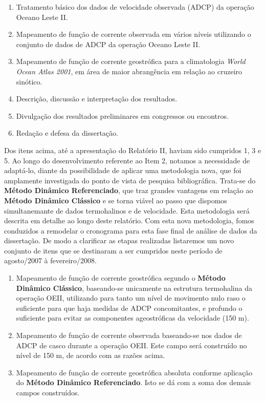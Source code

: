 \documentclass[12pt,portuguese,a4paper,pdftex]{article}
\begin{document}
\begin{enumerate}

\item Tratamento básico dos dados de velocidade observada (ADCP) da operação Oceano Leste II.

\item Mapeamento de função de corrente observada em vários níveis utilizando o conjunto 
de dados de ADCP da operação Oceano Leste II.

\item Mapeamento de função de corrente geostrófica para a climatologia  
{\it World Ocean Atlas 2001}, em área de maior abrangência em relação ao cruzeiro sinótico.

\item Descrição, discussão e interpretação dos resultados.

\item Divulgação dos resultados preliminares em congressos ou encontros.

\item Redação e defesa da dissertação.

\end{enumerate}

Dos itens acima, até a apresentação do Relatório II, haviam sido cumpridos 1, 3 e 5. Ao longo do desenvolvimento referente
ao Item 2, notamos a necessidade de adaptá-lo, diante da possibilidade de aplicar uma metodologia nova, que foi amplamente
investigada do ponto de vista de pesquisa bibliográfica. Trata-se do {\bf Método Dinâmico Referenciado}, que traz grandes vantagens 
em relação ao {\bf Método Dinâmico Clássico} e se torna viável ao passo que dispomos simultanemante de dados termohalinos e de 
velocidade. Esta metodologia será descrita em detalhe ao longo deste relatório. Com esta nova metodologia, fomos conduzidos 
a remodelar o cronograma para esta fase final de análise de dados da dissertação. De modo a clarificar as etapas realizadas
listaremos um novo conjunto de itens que se destinaram a ser cumpridos neste período de agosto/2007 à fevereiro/2008.

\begin{enumerate}

 \item Mapeamento de função de corrente
geostrófica segundo o {\bf Método Dinâmico Clássico}, baseando-se unicamente na estrutura termohalina da operação OEII, utilizando para
tanto um nível de movimento nulo raso o suficiente para que haja medidas de ADCP concomitantes, e profundo o suficiente para 
evitar as componentes ageostróficas da velocidade (150 m).
 
 \item Mapeamento de função de corrente
observada baseando-se nos dados de ADCP de casco durante a operação OEII. Este
campo será construído no nível de 150 m, de acordo com as razões acima. 

 \item Mapeamento de função de corrente geostrófica
absoluta conforme aplicação do {\bf Método Dinâmico Referenciado}.
 Isto se dá com a soma dos demais campos construídos.

\end{enumerate}
\end{document}
